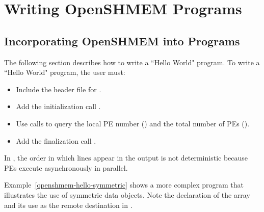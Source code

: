 \clearpage %

\appendix

\pagestyle{fancy}
\fancyhf{}
\fancyhead[L]{\leftmark}
\fancyhead[R]{\thepage}
\renewcommand{\headrulewidth}{0pt}
\renewcommand{\thesection}{\thesectionOrig}




\chapter{Writing OpenSHMEM Programs}
\section*{Incorporating OpenSHMEM into Programs}\label{sec:writing_programs}

The following section describes how to write a ``Hello World" \openshmem program.
To write a ``Hello World" \openshmem program, the user must:

\begin{itemize}
\item Include the header file  for \Cstd.
\item Add the initialization call \hyperref[subsec:shmem_init]{}.
\item Use \openshmem calls to query the local \ac{PE} number
    (\hyperref[subsec:shmem_my_pe]{}) and the total number
    of \acp{PE} (\hyperref[subsec:shmem_n_pes]{}).
\item Add the finalization call \hyperref[subsec:shmem_finalize]{}.
\end{itemize}

In \openshmem, the order in which lines appear in the output is not
deterministic because \acp{PE} execute asynchronously in parallel.



\clearpage %

Example~\ref{openshmem-hello-symmetric} shows a more complex
\openshmem program that illustrates the use of symmetric data objects.
Note the declaration of the  array and its use as the
remote destination in \hyperref[subsec:shmem_put]{}.

